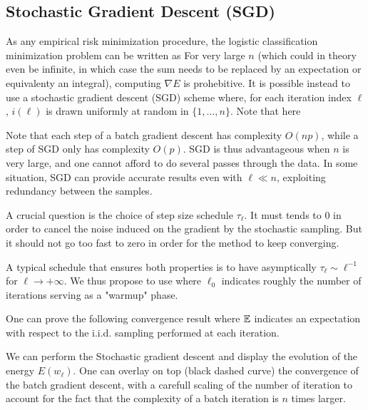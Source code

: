 


\subsection{Stochastic Gradient Descent (SGD)}


As any empirical risk minimization procedure, the 
logistic classification minimization problem can be written as 
For very large $n$ (which could in theory even be infinite, in which case the sum needs to be replaced 
by an expectation or equivalenty an integral), computing $\nabla E$ is prohebitive.  
It is possible instead to use a stochastic gradient descent (SGD) scheme
where, for each iteration index $\ell$, $i(\ell)$
is drawn uniformly at random in $  \{1,\ldots,n\} $. 
%
Note that here

Note that each step of a batch gradient descent has complexity $O(np)$,
while a step of SGD only has complexity $O(p)$. SGD is thus
advantageous when $n$ is very large, and one cannot afford to do
several passes through the data. In some situation, SGD can provide
accurate results even with $\ell \ll n$, exploiting redundancy between
the samples.  


A crucial question is the choice of step size schedule $\tau_\ell$. It
must tends to 0 in order to cancel the noise induced on the gradient by
the stochastic sampling. But it should not go too fast to zero in order
for the method to keep converging. 


A typical schedule that ensures both properties is to have asymptically $\tau_\ell \sim \ell^{-1}$ for
$\ell\rightarrow +\infty$. We thus propose to use 
where $\ell_0$ indicates roughly the number of iterations serving as a
"warmup" phase.


One can prove the following convergence result
where $\mathbb{E}$ indicates an expectation with respect to the i.i.d.
sampling performed at each iteration.


We can perform the Stochastic gradient descent and display the evolution of the energy $E(w_\ell)$. 
One can overlay on top (black dashed curve) the convergence of the batch gradient descent, with a carefull scaling of the 
number of iteration to account for the fact that the complexity of a batch iteration is $n$ times larger. 


